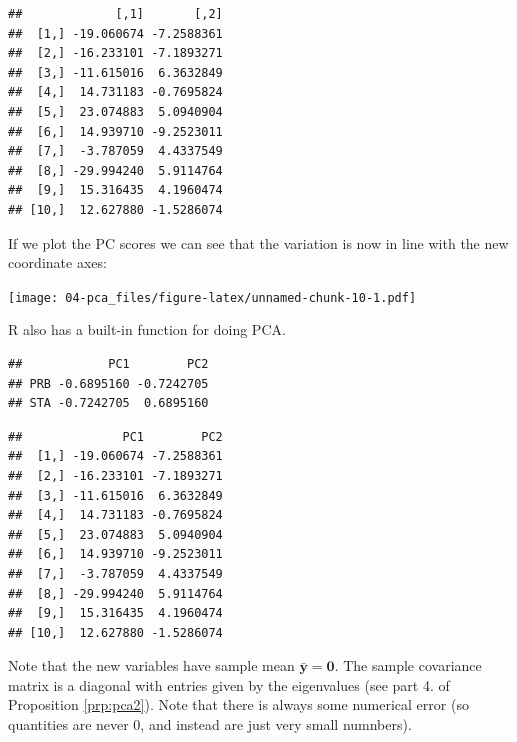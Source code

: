 \documentclass[]{book}
\newenvironment{Shaded}{\begin{snugshade}}{\end{snugshade}}
\newcommand{\CommentTok}[1]{\textcolor[rgb]{0.56,0.35,0.01}{\textit{#1}}}
\newcommand{\DecValTok}[1]{\textcolor[rgb]{0.00,0.00,0.81}{#1}}
\newcommand{\KeywordTok}[1]{\textcolor[rgb]{0.13,0.29,0.53}{\textbf{#1}}}
\newcommand{\NormalTok}[1]{#1}
\newcommand{\OperatorTok}[1]{\textcolor[rgb]{0.81,0.36,0.00}{\textbf{#1}}}
\newcommand{\StringTok}[1]{\textcolor[rgb]{0.31,0.60,0.02}{#1}}
\theoremstyle{definition}
\theoremstyle{definition}
\theoremstyle{definition}
\theoremstyle{remark}
\begin{document}
\begin{verbatim}
##             [,1]       [,2]
##  [1,] -19.060674 -7.2588361
##  [2,] -16.233101 -7.1893271
##  [3,] -11.615016  6.3632849
##  [4,]  14.731183 -0.7695824
##  [5,]  23.074883  5.0940904
##  [6,]  14.939710 -9.2523011
##  [7,]  -3.787059  4.4337549
##  [8,] -29.994240  5.9114764
##  [9,]  15.316435  4.1960474
## [10,]  12.627880 -1.5286074
\end{verbatim}

If we plot the PC scores we can see that the variation is now in line with the new coordinate axes:

\texttt{[image: 04-pca\_files/figure-latex/unnamed-chunk-10-1.pdf]}

R also has a built-in function for doing PCA.

\begin{Shaded}
\end{Shaded}

\begin{verbatim}
##            PC1        PC2
## PRB -0.6895160 -0.7242705
## STA -0.7242705  0.6895160
\end{verbatim}

\begin{Shaded}
\end{Shaded}

\begin{verbatim}
##              PC1        PC2
##  [1,] -19.060674 -7.2588361
##  [2,] -16.233101 -7.1893271
##  [3,] -11.615016  6.3632849
##  [4,]  14.731183 -0.7695824
##  [5,]  23.074883  5.0940904
##  [6,]  14.939710 -9.2523011
##  [7,]  -3.787059  4.4337549
##  [8,] -29.994240  5.9114764
##  [9,]  15.316435  4.1960474
## [10,]  12.627880 -1.5286074
\end{verbatim}

Note that the new variables have sample mean \(\bar{\mathbf y}=\boldsymbol 0\). The sample covariance matrix is a diagonal with entries given by the eigenvalues (see part 4. of Proposition \ref{prp:pca2}). Note that there is always some numerical error (so quantities are never 0, and instead are just very small numnbers).
\end{document}
